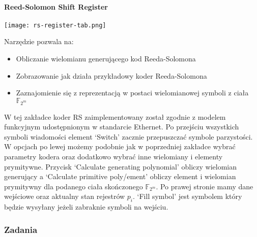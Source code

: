 \paragraph{Reed-Solomon Shift Register}
\begin{center}
    \texttt{[image: rs-register-tab.png]}
\end{center}
Narzędzie pozwala na:
\begin{itemize}
    \item Obliczanie wielomianu generującego kod Reeda-Solomona
    \item Zobrazowanie jak działa przykładowy koder Reeda-Solomona
    \item Zaznajomienie się z reprezentacją w postaci wielomianowej symboli z ciała $\mathbb{F}_{2^m}$
\end{itemize}

W tej zakładce koder RS zaimplementowany został zgodnie z modelem
funkcyjnym udostępnionym w standarcie Ethernet. Po przejściu
wszystkich symboli wiadomości element `Switch' zacznie przepuszczać symbole parzystości.
W opcjach po lewej możemy podobnie jak w poprzedniej zakładce wybrać
parametry kodera oraz dodatkowo wybrać inne wielomiany i elementy prymitywne. Przycisk `Calculate generating polynomial' obliczy
wielomian generujący a `Calculate primitive poly/ement' obliczy element i wielomian prymitywny dla podanego ciała skończonego $\mathbb{F}_{2^m}$.
Po prawej stronie mamy dane wejściowe oraz aktualny stan rejestrów $p_i$. `Fill symbol' jest symbolem który będzie wysyłany jeżeli zabraknie symboli na wejściu.

\subsubsection{Zadania}

